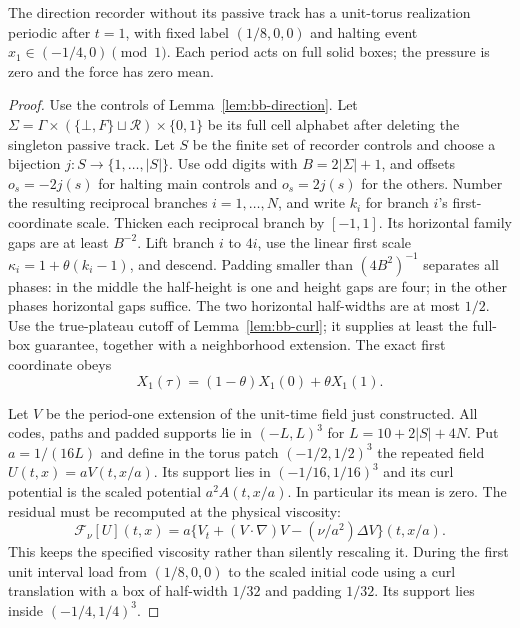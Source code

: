 \begin{proposition}
\label{prop:bb-mid-scaled-torus}
The direction recorder without its passive track has a unit-torus
realization periodic after $t=1$, with fixed label $(1/8,0,0)$ and
halting event $x_1\in(-1/4,0)\pmod1$.  Each period acts on full
solid boxes; the pressure is zero and the force has zero mean.
\end{proposition}
\begin{proof}\label{proof:bb-mid-scaled-torus}
Use the controls of Lemma~\ref{lem:bb-direction}. Let
$\Sigma=\Gamma\times(\{\bot,F\}\sqcup\mathcal R)\times\{0,1\}$
be its full cell alphabet after deleting the singleton passive track.
Let $S$ be the finite set of recorder controls and choose a bijection
$j:S\to\{1,\ldots,|S|\}$.
Use odd digits with $B=2|\Sigma|+1$, and offsets $o_s=-2j(s)$ for halting main
controls and $o_s=2j(s)$ for the others. Number the resulting reciprocal branches
$i=1,\ldots,N$, and write $k_i$ for branch $i$'s first-coordinate scale.
Thicken each reciprocal branch by
$[-1,1]$.  Its horizontal family gaps are at least $B^{-2}$.
Lift branch $i$ to $4i$, use the linear first scale
$\kappa_i=1+\theta(k_i-1)$, and descend.  Padding smaller than
$(4B^2)^{-1}$ separates all phases: in the middle the half-height
is one and height gaps are four; in the other phases horizontal
gaps suffice.  The two horizontal half-widths are at most $1/2$.
Use the true-plateau cutoff of Lemma~\ref{lem:bb-curl}; it supplies
at least the full-box guarantee, together with a neighborhood extension.
The exact first coordinate obeys
\begin{equation}\label{eq:bb-mid-scaled-convex}
 X_1(\tau)=(1-\theta)X_1(0)+\theta X_1(1).
\end{equation}

Let $V$ be the period-one extension of the unit-time field just constructed.
All codes, paths and padded supports lie in $(-L,L)^3$ for
$L=10+2|S|+4N$.  Put $a=1/(16L)$ and define in the torus patch
$(-1/2,1/2)^3$ the repeated field $U(t,x)=aV(t,x/a)$.
Its support lies in $(-1/16,1/16)^3$ and its curl potential is the
scaled potential $a^2A(t,x/a)$.  In particular its mean is zero.
The residual must be recomputed at the physical viscosity:
\begin{equation}\label{eq:bb-mid-viscosity-scale}
 \mathcal F_\nu[U](t,x)=a\{V_t+(V\cdot\nabla)V-(\nu/a^2)\Delta V\}(t,x/a).
\end{equation}
This keeps the specified viscosity rather than silently rescaling it.
During the first unit interval load from $(1/8,0,0)$ to the scaled
initial code using a curl translation with a box of half-width $1/32$
and padding $1/32$.  Its support lies inside $(-1/4,1/4)^3$.


\end{proof}
